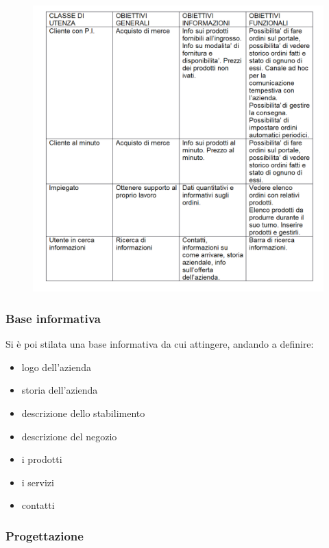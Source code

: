 \begin{itemize}
	\begin{figure}[h!]
		\includegraphics[width=1\linewidth]{StyleLatex/img/obiettivi.png}
	\end{figure}

\end{itemize}


\subsubsection{Base informativa}

Si è poi stilata una base informativa da cui attingere, andando a definire:

\begin{itemize}
	\item logo dell'azienda 
	\item storia dell'azienda 
	\item descrizione dello stabilimento 
	\item descrizione del negozio
	\item i prodotti
	\item i servizi
	\item contatti
\end{itemize} 

\subsubsection{Progettazione}


